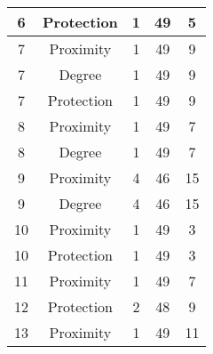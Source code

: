 \documentclass[results.tex]{subfiles}
\begin{document}
\begin{center}
\begin{tabular}{| c || c | c | c | c |}
            \hline
            6                       & Protection                   & 1                      & 49                      & 5                    \\
            \hline
            7                       & Proximity                    & 1                      & 49                      & 9                    \\
            \hline
            7                       & Degree                       & 1                      & 49                      & 9                    \\
            \hline
            7                       & Protection                   & 1                      & 49                      & 9                    \\
            \hline
            8                       & Proximity                    & 1                      & 49                      & 7                    \\
            \hline
            8                       & Degree                       & 1                      & 49                      & 7                    \\
            \hline
            9                       & Proximity                    & 4                      & 46                      & 15                   \\
            \hline
            9                       & Degree                       & 4                      & 46                      & 15                   \\
            \hline
            10                      & Proximity                    & 1                      & 49                      & 3                    \\
            \hline
            10                      & Protection                   & 1                      & 49                      & 3                    \\
            \hline
            11                      & Proximity                    & 1                      & 49                      & 7                    \\
            \hline
            12                      & Protection                   & 2                      & 48                      & 9                    \\
            \hline
            13                      & Proximity                    & 1                      & 49                      & 11                   \\

\end{tabular}
\end{center}
\end{document}
